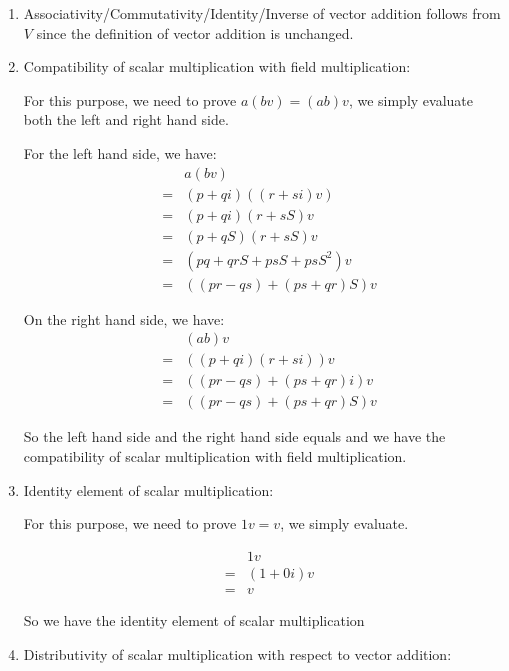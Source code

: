 \begin{enumerate}
    \item{ 
        Associativity/Commutativity/Identity/Inverse of vector addition follows from $ V $ since the definition of vector addition is unchanged.
    }
    \item {
        Compatibility of scalar multiplication with field multiplication:
        
        For this purpose, we need to prove $ a(bv) = (ab)v $, we simply evaluate both the left and right hand side.

        For the left hand side, we have:
        \begin{eqnarray*}
          & & a(bv) \\
          &=& (p+qi)((r+si) v) \\
          &=& (p+qi)(r+sS)v \\
          &=& (p+qS)(r+sS)v \\
          &=& (pq + qrS + psS + psS^2)v \\
          &=& ((pr-qs) + (ps+qr)S)v
        \end{eqnarray*}

        On the right hand side, we have:
        \begin{eqnarray*}
          & & (ab)v \\
          &=& ((p+qi)(r+si))v \\
          &=& ((pr-qs)+(ps+qr)i)v \\
          &=& ((pr-qs)+(ps+qr)S)v
        \end{eqnarray*}

        So the left hand side and the right hand side equals and we have the compatibility of scalar multiplication with field multiplication.
    }
    \item {
        Identity element of scalar multiplication:

        For this purpose, we need to prove $ 1v = v $, we simply evaluate.

        \begin{eqnarray*}
          & & 1v \\
          &=& (1+0i)v \\
          &=& v
        \end{eqnarray*}

        So we have the identity element of scalar multiplication
    }
    \item {
        Distributivity of scalar multiplication with respect to vector addition:

}
\end{enumerate}
